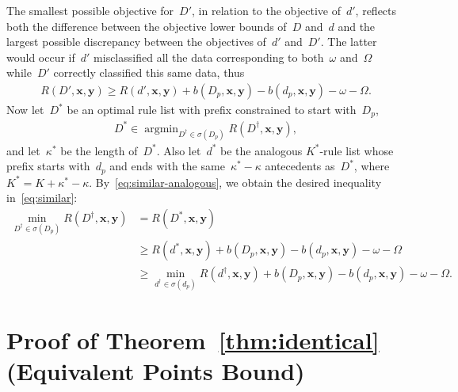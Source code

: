 \documentclass[twoside,11pt]{article}
\newcommand{\x}{\mathbf{x}}
\newcommand{\y}{\mathbf{y}}
\def\RL{{d}}
\def\Prefix{d_p}
\def\RLB{{D}}
\def\PrefixB{D_p}
\def\Obj{R}
\def\StartsWith{\sigma}
\DeclareMathOperator*{\argmin}{argmin}
\begin{document}
%
The smallest possible objective for~$\RLB'$, in relation
to the objective of~$\RL'$, reflects both the difference
between the objective lower bounds of~$\RLB$ and~$\RL$
and the largest possible discrepancy between the
objectives of~$\RL'$ and~$\RLB'$.
%
The latter would occur if~$\RL'$ misclassified all the data
corresponding to both~$\omega$ and~$\Omega$ while~$\RLB'$
correctly classified this same data, thus
\begin{align}
\Obj(\RLB', \x, \y) \ge \Obj(\RL', \x, \y)
  + b(\PrefixB, \x, \y) - b(\Prefix, \x, \y) - \omega - \Omega.
\label{eq:similar-analogous}
\end{align}
%
Now let~$\RLB^*$ be an optimal rule list with prefix
constrained to start with~$\PrefixB$,
\begin{align*}
\RLB^* \in \argmin_{\RLB^\dagger \in \StartsWith(\PrefixB)} \Obj(\RLB^\dagger, \x, \y),
\end{align*}
and let~$\kappa^*$ be the length of~$\RLB^*$.
%
Also let~$\RL^*$ be the analogous $K^*$-rule list whose prefix
starts with~$\Prefix$ and ends with the same~${\kappa^* - \kappa}$
antecedents as~$\RLB^*$, where~${K^* = K + \kappa^* - \kappa}$.
%
By~\eqref{eq:similar-analogous}, we obtain the desired inequality in~\eqref{eq:similar}:
\begin{align*}
\min_{\RLB^\dagger \in \StartsWith(\PrefixB)} \Obj(\RLB^\dagger, \x, \y)
&= \Obj(\RLB^*, \x, \y) \\
&\ge \Obj(\RL^*, \x, \y)
  + b(\PrefixB, \x, \y) - b(\Prefix, \x, \y) - \omega - \Omega \\
&\ge \min_{\RL^\dagger \in \StartsWith(\Prefix)} \Obj(\RL^\dagger, \x, \y)
  + b(\PrefixB, \x, \y) - b(\Prefix, \x, \y) - \omega - \Omega.
\end{align*}

\section{Proof of Theorem~\ref{thm:identical} (Equivalent Points Bound)}
\label{appendix:equiv-pts}
\end{document}
